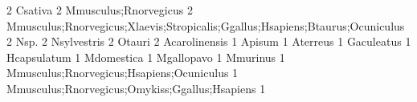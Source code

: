 \documentclass{article}
\renewenvironment{Schunk}{\vspace{\topsep}}{\vspace{\topsep}}
\begin{document}
\begin{Schunk}
\begin{Soutput}
                                                                            2 
                                                                      Csativa 
                                                                            2 
                                                        Mmusculus;Rnorvegicus 
                                                                            2 
Mmusculus;Rnorvegicus;Xlaevis;Stropicalis;Ggallus;Hsapiens;Btaurus;Ocuniculus 
                                                                            2 
                                                                         Nsp. 
                                                                            2 
                                                                  Nsylvestris 
                                                                            2 
                                                                       Otauri 
                                                                            2 
                                                                Acarolinensis 
                                                                            1 
                                                                       Apisum 
                                                                            1 
                                                                     Aterreus 
                                                                            1 
                                                                   Gaculeatus 
                                                                            1 
                                                                  Hcapsulatum 
                                                                            1 
                                                                   Mdomestica 
                                                                            1 
                                                                   Mgallopavo 
                                                                            1 
                                                                     Mmurinus 
                                                                            1 
                                    Mmusculus;Rnorvegicus;Hsapiens;Ocuniculus 
                                                                            1 
                               Mmusculus;Rnorvegicus;Omykiss;Ggallus;Hsapiens 
                                                                            1 

\end{Soutput}
\end{Schunk}
\end{document}
